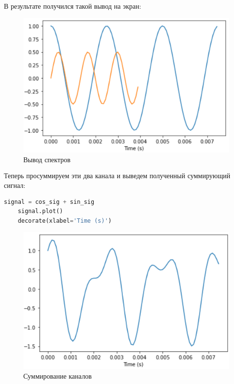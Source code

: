 \documentclass[a4paper]{article}
\begin{document}
            В результате получился такой вывод на экран:
            \begin{figure}[H]
                \centering
                \includegraphics[width=\textwidth]{spectr_out.png}
                \caption{Вывод спектров}
                \label{fig:spectr_out}
            \end{figure}
            
            Теперь просуммируем эти два канала и выведем полученный суммирующий сигнал:
            
\begin{lstlisting}[language=Python, caption= Суммирование каналов]
    signal = cos_sig + sin_sig
    signal.plot()
    decorate(xlabel='Time (s)')
\end{lstlisting}
            
            \begin{figure}[H]
                \centering
                \includegraphics[width=\textwidth]{spectr_sum.png}
                \caption{Суммирование каналов}
                \label{fig:spectr_sum}
            \end{figure}
            
\end{document}
